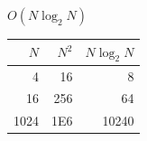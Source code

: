 \documentclass[11pt,a4paper]{article}
\begin{document}

$O(N\log_{2}N)$


\begin{center}
\begin{tabular}{rrr}
$N$ & $N^{2}$ & $N\log_{2}N$ \\ \hline
4 & 16 & 8 \\
16 & 256 & 64 \\
1024 & 1E6 & 10240
\end{tabular}
\end{center}
\end{document}
